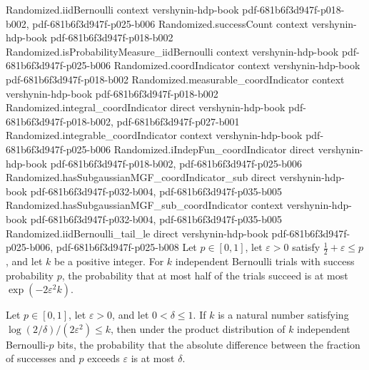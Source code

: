 \begin{theorem}
\label{Randomized.majority_error_le}
\leanok
{}
\proofstep
  {Randomized.iidBernoulli}
  {context}
  {vershynin-hdp-book}
  {pdf-681b6f3d947f-p018-b002,
    pdf-681b6f3d947f-p025-b006}
\proofstep
  {Randomized.successCount}
  {context}
  {vershynin-hdp-book}
  {pdf-681b6f3d947f-p018-b002}
\proofstep
  {Randomized.isProbabilityMeasure_iidBernoulli}
  {context}
  {vershynin-hdp-book}
  {pdf-681b6f3d947f-p025-b006}
\proofstep
  {Randomized.coordIndicator}
  {context}
  {vershynin-hdp-book}
  {pdf-681b6f3d947f-p018-b002}
\proofstep
  {Randomized.measurable_coordIndicator}
  {context}
  {vershynin-hdp-book}
  {pdf-681b6f3d947f-p018-b002}
\proofstep
  {Randomized.integral_coordIndicator}
  {direct}
  {vershynin-hdp-book}
  {pdf-681b6f3d947f-p018-b002,
    pdf-681b6f3d947f-p027-b001}
\proofstep
  {Randomized.integrable_coordIndicator}
  {context}
  {vershynin-hdp-book}
  {pdf-681b6f3d947f-p025-b006}
\proofstep
  {Randomized.iIndepFun_coordIndicator}
  {direct}
  {vershynin-hdp-book}
  {pdf-681b6f3d947f-p018-b002,
    pdf-681b6f3d947f-p025-b006}
\proofstep
  {Randomized.hasSubgaussianMGF_coordIndicator_sub}
  {direct}
  {vershynin-hdp-book}
  {pdf-681b6f3d947f-p032-b004,
    pdf-681b6f3d947f-p035-b005}
\proofstep
  {Randomized.hasSubgaussianMGF_sub_coordIndicator}
  {context}
  {vershynin-hdp-book}
  {pdf-681b6f3d947f-p032-b004,
    pdf-681b6f3d947f-p035-b005}
\proofstep
  {Randomized.iidBernoulli_tail_le}
  {direct}
  {vershynin-hdp-book}
  {pdf-681b6f3d947f-p025-b006,
    pdf-681b6f3d947f-p025-b008}
Let $p\in[0,1]$, let $\varepsilon>0$ satisfy $\tfrac12+\varepsilon\le p$, and let $k$ be
a positive integer. For $k$ independent Bernoulli trials with success probability $p$,
the probability that at most half of the trials succeed is at most
$\exp(-2\varepsilon^2k)$.
\end{theorem}

\begin{theorem}
\label{Randomized.iid_bernoulli_avg_concentration_of_le}
\leanok
{}
Let $p\in[0,1]$, let $\varepsilon>0$, and let $0<\delta\le 1$. If $k$ is a natural
number satisfying $\log(2/\delta)/(2\varepsilon^2)\le k$, then under the product
distribution of $k$ independent Bernoulli-$p$ bits, the probability that the absolute
difference between the fraction of successes and $p$ exceeds $\varepsilon$ is at most
$\delta$.
\end{theorem}


